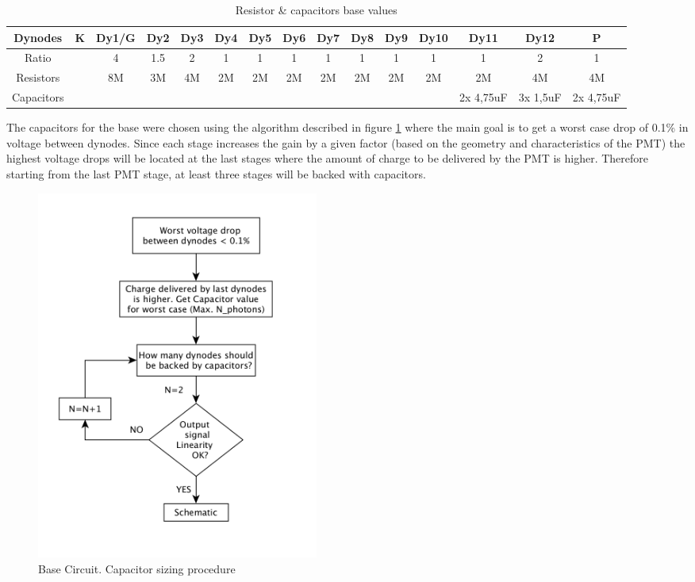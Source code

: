 \documentclass[a4paper, 10pt, oneside, twocolumn, 3p]{elsarticle}
\begin{document}
\begin{table}[ht]
\scriptsize
	\caption{Resistor \& capacitors base values}
	\label{tab:R_C_values}	
	\begin{center}
		\begin{tabular}{ c | c | c | c | c | c | c | c | c | c | c | c | c | c | c |}
			Dynodes & K & Dy1/G & Dy2 & Dy3 & Dy4 & Dy5 & Dy6 & Dy7 & Dy8 & Dy9 & Dy10 & Dy11 & Dy12 & P\\
			\hline
			Ratio & &  4 & 1.5 & 2 & 1 & 1 & 1 & 1 & 1 & 1 & 1 & 1 & 2 & 1 \\
			\hline
			Resistors & & 8M & 3M & 4M & 2M & 2M & 2M & 2M & 2M & 2M & 2M & 2M & 4M & 4M  \\
			\hline
			Capacitors &  &  &  &  &  &  &  &  &  &  &  & 2x 4,75uF & 3x 1,5uF & 2x 4,75uF  \\
		\end{tabular}
	\end{center}
\end{table}


\par The capacitors for the base were chosen using the algorithm described in figure \ref{fig:Base_Sizing} where the main goal is to get a worst case drop of 0.1\% in voltage between dynodes. Since each stage increases the gain by a given factor (based on the geometry and characteristics of the PMT) the highest voltage drops will be located at the last stages where the amount of charge to be delivered by the PMT is higher. Therefore starting from the last PMT stage, at least three stages will be backed with capacitors. 

\begin{figure}
  \begin{center}
    \includegraphics[width=0.45\textwidth]{./figures/diagrama.png}
    \caption{Base Circuit. Capacitor sizing procedure}
    \label{fig:Base_Sizing}
  \end{center}
\end{figure}
\end{document}
